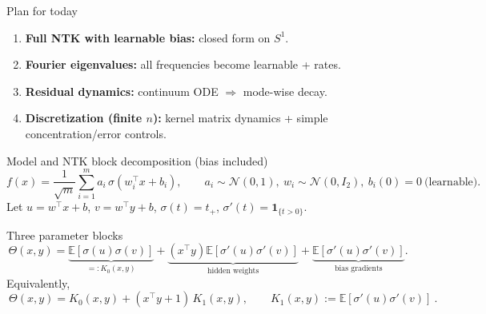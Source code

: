 \documentclass[10pt,aspectratio=169]{beamer}
\newcommand{\E}{\mathbb{E}}
\begin{document}
\begin{frame}{Plan for today}
	\begin{enumerate}
		\item \textbf{Full NTK with learnable bias:} closed form on $S^1$.
		\item \textbf{Fourier eigenvalues:} all frequencies become learnable + rates.
		\item \textbf{Residual dynamics:} continuum ODE $\Rightarrow$ mode-wise decay.
		\item \textbf{Discretization (finite $n$):} kernel matrix dynamics + simple concentration/error controls.
	\end{enumerate}
\end{frame}

\begin{frame}{Model and NTK block decomposition (bias included)}
	\small
	\[
		f(x)=\frac{1}{\sqrt m}\sum_{i=1}^m a_i\,\sigma(w_i^\top x+b_i),
		\qquad a_i\sim\mathcal N(0,1),\ w_i\sim\mathcal N(0,I_2),\ b_i(0)=0\ \text{(learnable)}.
	\]
	Let $u=w^\top x+b$, $v=w^\top y+b$, $\sigma(t)=t_+$, $\sigma'(t)=\mathbf 1_{\{t>0\}}$.
	\begin{block}{Three parameter blocks}
		\[
			\Theta(x,y)=
			\underbrace{\E[\sigma(u)\sigma(v)]}_{=:K_0(x,y)}
			+\underbrace{(x^\top y)\E[\sigma'(u)\sigma'(v)]}_{\text{hidden weights}}
			+\underbrace{\E[\sigma'(u)\sigma'(v)]}_{\text{bias gradients}}.
		\]
		Equivalently,
		\[
			\boxed{\ \Theta(x,y)=K_0(x,y)+(x^\top y+1)\,K_1(x,y),\qquad K_1(x,y):=\E[\sigma'(u)\sigma'(v)]\ }.
		\]
	\end{block}
\end{frame}
\end{document}
